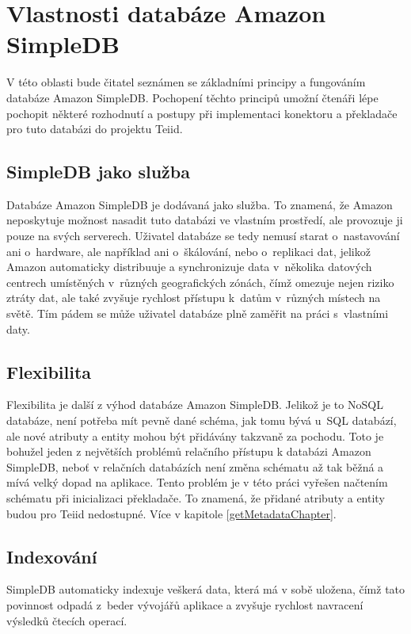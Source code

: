 \documentclass[oneside,12pt]{fithesis2}
\begin{document}
\section{Vlastnosti databáze Amazon SimpleDB}
V této oblasti bude čitatel seznámen se základními principy a fungováním databáze Amazon SimpleDB. Pochopení těchto principů umožní čtenáři lépe pochopit některé rozhodnutí a postupy při implementaci konektoru a překladače pro tuto databázi do projektu Teiid.
\subsection{SimpleDB jako služba}
Databáze Amazon SimpleDB je dodávaná jako služba. To znamená, že Amazon neposkytuje možnost nasadit tuto databázi ve vlastním prostředí, ale provozuje ji pouze na svých serverech. Uživatel databáze se tedy nemusí starat o~nastavování ani o~hardware, ale například ani o~škálování, nebo o~replikaci dat, jelikož Amazon automaticky distribuuje a synchronizuje data v~několika datových centrech umístěných v~různých geografických zónách, čímž omezuje nejen riziko ztráty dat, ale také zvyšuje rychlost přístupu k~datům v~různých místech na světě. Tím pádem se může uživatel databáze plně zaměřit na práci s~vlastními daty.
\subsection{Flexibilita}
Flexibilita je další z výhod databáze Amazon SimpleDB. Jelikož je to NoSQL databáze, není potřeba mít pevně dané schéma, jak tomu bývá u~SQL databází, ale nové atributy a entity mohou být přidávány takzvaně za pochodu. Toto je bohužel jeden z největších problémů relačního přístupu k databázi Amazon SimpleDB, neboť v relačních databázích není změna schématu až tak běžná a mívá velký dopad na aplikace. Tento problém je v této práci vyřešen načtením schématu při inicializaci překladače. To znamená, že  přidané atributy a entity budou pro Teiid nedostupné. Více v kapitole \ref{getMetadataChapter}.
\subsection{Indexování}
SimpleDB automaticky indexuje veškerá data, která má v sobě uložena, čímž tato povinnost odpadá z~beder vývojářů aplikace a zvyšuje rychlost navracení výsledků čtecích operací.	
\end{document}
